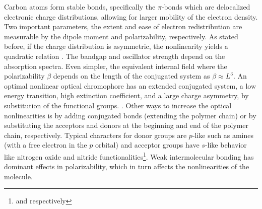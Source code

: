 
Carbon atoms form stable bonds, specifically the $\pi$-bonds which are delocalized electronic charge distributions, allowing for larger mobility of the electron density. Two important parameters, the extent and ease of electron redistribution are measurable by the dipole moment and polarizability, respectively. As stated before, if the charge distribution is asymmetric, the nonlinearity yields a quadratic relation \cite{BosshardOrgaNLO95}. The bandgap and oscillator strength depend on the absorption spectra. Even simpler, the equivalent internal field where the polarizability $\beta$ depends on the length of the conjugated system as $\beta \approx L^3$. An optimal nonlinear optical chromophore has an extended conjugated system, a low energy transition, high extinction coefficient, and a large charge asymmetry, by substitution of the functional groups. \cite{BosshardOrgaNLO95}. Other ways to increase the optical nonlinearities is by adding conjugated bonds (extending the polymer chain) or by substituting the acceptors and donors at the beginning and end of the polymer chain, respectively. Typical characters for donor groups are $p$-like such as amines (with a free electron in the $p$ orbital) and acceptor groups have $s$-like behavior like nitrogen oxide and nitride functionalities\footnote{ and  respectively}. Weak intermolecular bonding has dominant effects in polarizability, which in turn affects the nonlinearities of the molecule. 

